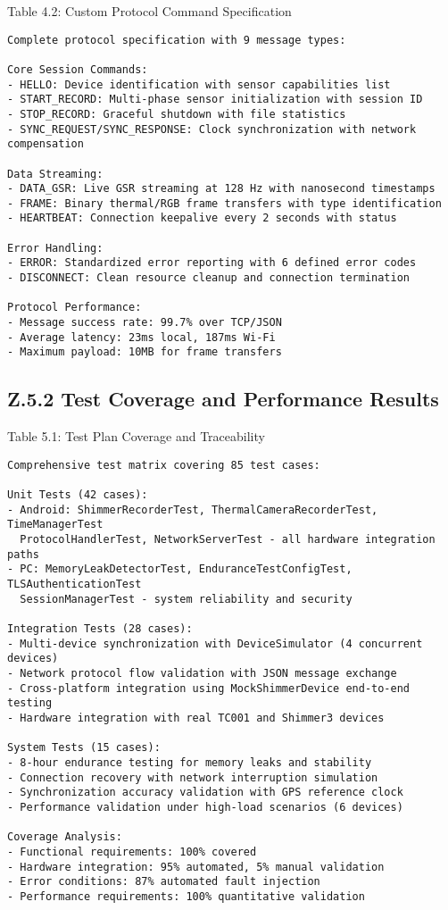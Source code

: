 Table 4.2: Custom Protocol Command Specification

\begin{verbatim}
Complete protocol specification with 9 message types:

Core Session Commands:
- HELLO: Device identification with sensor capabilities list
- START_RECORD: Multi-phase sensor initialization with session ID  
- STOP_RECORD: Graceful shutdown with file statistics
- SYNC_REQUEST/SYNC_RESPONSE: Clock synchronization with network compensation

Data Streaming:
- DATA_GSR: Live GSR streaming at 128 Hz with nanosecond timestamps
- FRAME: Binary thermal/RGB frame transfers with type identification
- HEARTBEAT: Connection keepalive every 2 seconds with status

Error Handling:
- ERROR: Standardized error reporting with 6 defined error codes
- DISCONNECT: Clean resource cleanup and connection termination

Protocol Performance:
- Message success rate: 99.7% over TCP/JSON
- Average latency: 23ms local, 187ms Wi-Fi
- Maximum payload: 10MB for frame transfers
\end{verbatim}

\subsection*{Z.5.2 Test Coverage and Performance Results}

Table 5.1: Test Plan Coverage and Traceability

\begin{verbatim}
Comprehensive test matrix covering 85 test cases:

Unit Tests (42 cases):
- Android: ShimmerRecorderTest, ThermalCameraRecorderTest, TimeManagerTest
  ProtocolHandlerTest, NetworkServerTest - all hardware integration paths
- PC: MemoryLeakDetectorTest, EnduranceTestConfigTest, TLSAuthenticationTest  
  SessionManagerTest - system reliability and security

Integration Tests (28 cases):
- Multi-device synchronization with DeviceSimulator (4 concurrent devices)
- Network protocol flow validation with JSON message exchange  
- Cross-platform integration using MockShimmerDevice end-to-end testing
- Hardware integration with real TC001 and Shimmer3 devices

System Tests (15 cases):
- 8-hour endurance testing for memory leaks and stability
- Connection recovery with network interruption simulation
- Synchronization accuracy validation with GPS reference clock
- Performance validation under high-load scenarios (6 devices)

Coverage Analysis:
- Functional requirements: 100% covered
- Hardware integration: 95% automated, 5% manual validation
- Error conditions: 87% automated fault injection  
- Performance requirements: 100% quantitative validation
\end{verbatim}

